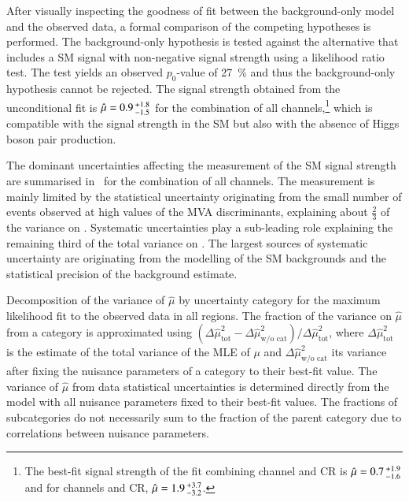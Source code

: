 
After visually inspecting the goodness of fit between the
background-only model and the observed data, a formal comparison of
the competing hypotheses is performed. The background-only hypothesis
is tested against the alternative that includes a SM \HH signal with
non-negative signal strength using a likelihood ratio test. The test
yields an observed $p_0$-value of \SI{27}{\percent} and thus the
background-only hypothesis cannot be rejected.
The signal strength obtained from the unconditional fit is
$\hat{\mu} = 0.9\,\numpmerr{+1.8}{-1.5}$ for the combination of all
channels,\footnote{The best-fit signal strength of the fit combining
  \hadhad channel and CR is $\hat{\mu} = 0.7\,\numpmerr{+1.9}{-1.6}$
  and for \lephad channels and CR,
  $\hat{\mu} = 1.9\,\numpmerr{+3.7}{-3.2}$.} which is compatible with
the signal strength in the SM but also with the absence of Higgs boson
pair production.

The dominant uncertainties affecting the measurement of the SM \HH
signal strength are summarised in~ for the
combination of all channels. The measurement is mainly limited by the
statistical uncertainty originating from the small number of events
observed at high values of the MVA discriminants, explaining about
$\frac{2}{3}$ of the variance on \muhat. Systematic uncertainties play
a sub-leading role explaining the remaining third of the total
variance on \muhat. The largest sources of systematic uncertainty are
originating from the modelling of the SM backgrounds and the
statistical precision of the background estimate.

\begin{table}[htbp]
  \centering

  \caption{Decomposition of the variance of $\hat{\mu}$ by uncertainty
    category for the maximum likelihood fit to the observed data in
    all regions. The fraction of the variance on $\hat{\mu}$ from a
    category is approximated using
    $(\Delta\hat{\mu}^2_{\text{tot}} - \Delta\hat{\mu}^2_{\text{w/o
        cat}}) / \Delta \hat{\mu}^2_{\text{tot}}$, where
    $\Delta\hat{\mu}^2_{\text{tot}}$ is the estimate of the total
    variance of the MLE of $\mu$ and
    $\Delta\hat{\mu}^2_{\text{w/o cat}}$ its variance after fixing the
    nuisance parameters of a category to their best-fit value. The
    variance of $\hat{\mu}$ from data statistical uncertainties is
    determined directly from the model with all nuisance parameters
    fixed to their best-fit values. The fractions of subcategories do
    not necessarily sum to the fraction of the parent category due to
    correlations between nuisance parameters.}

  

  \label{tab:breakdown_nonres}
\end{table}

